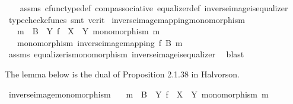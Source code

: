 \begin{isabellebody}
%
\isadelimproof
\ \ %
\endisadelimproof
%
\isatagproof
{}\isamarkupfalse%
\ assms\ cfunc{\isacharunderscore}{\kern0pt}type{\isacharunderscore}{\kern0pt}def\ comp{\isacharunderscore}{\kern0pt}associative\ equalizer{\isacharunderscore}{\kern0pt}def\ inverse{\isacharunderscore}{\kern0pt}image{\isacharunderscore}{\kern0pt}is{\isacharunderscore}{\kern0pt}equalizer{}\isanewline
\ \ \isamarkupfalse%
\ {\isacharparenleft}{\kern0pt}typecheck{\isacharunderscore}{\kern0pt}cfuncs{\isacharcomma}{\kern0pt}\ smt\ {\isacharparenleft}{\kern0pt}verit{\isacharparenright}{\kern0pt}{\isacharparenright}{\kern0pt}%
\endisatagproof
{\isafoldproof}%
%
\isadelimproof
\isanewline
%
\endisadelimproof
\isanewline
{}\isamarkupfalse%
\ inverse{\isacharunderscore}{\kern0pt}image{\isacharunderscore}{\kern0pt}mapping{\isacharunderscore}{\kern0pt}monomorphism{\isacharcolon}{\kern0pt}\isanewline
\ \ \ {\isachardoublequoteopen}m\ {\isacharcolon}{\kern0pt}\ B\ {\isasymrightarrow}\ Y{\isachardoublequoteclose}\ {\isachardoublequoteopen}f\ {\isacharcolon}{\kern0pt}\ X\ {\isasymrightarrow}\ Y{\isachardoublequoteclose}\ {\isachardoublequoteopen}monomorphism\ m{\isachardoublequoteclose}\isanewline
\ \ \ {\isachardoublequoteopen}monomorphism\ {\isacharparenleft}{\kern0pt}inverse{\isacharunderscore}{\kern0pt}image{\isacharunderscore}{\kern0pt}mapping\ f\ B\ m{\isacharparenright}{\kern0pt}{\isachardoublequoteclose}\isanewline
%
\isadelimproof
\ \ %
\endisadelimproof
%
\isatagproof
{}\isamarkupfalse%
\ assms\ equalizer{\isacharunderscore}{\kern0pt}is{\isacharunderscore}{\kern0pt}monomorphism\ inverse{\isacharunderscore}{\kern0pt}image{\isacharunderscore}{\kern0pt}is{\isacharunderscore}{\kern0pt}equalizer{}\ \isamarkupfalse%
\ blast%
\endisatagproof
{\isafoldproof}%
%
\isadelimproof
%
\endisadelimproof
%
\begin{isamarkuptext}%
The lemma below is the dual of Proposition 2.1.38 in Halvorson.%
\end{isamarkuptext}\isamarkuptrue%
\isamarkupfalse%
\ inverse{\isacharunderscore}{\kern0pt}image{\isacharunderscore}{\kern0pt}monomorphism{\isacharcolon}{\kern0pt}\isanewline
\ \ \ {\isachardoublequoteopen}m\ {\isacharcolon}{\kern0pt}\ B\ {\isasymrightarrow}\ Y{\isachardoublequoteclose}\ {\isachardoublequoteopen}f\ {\isacharcolon}{\kern0pt}\ X\ {\isasymrightarrow}\ Y{\isachardoublequoteclose}\ {\isachardoublequoteopen}monomorphism\ m{\isachardoublequoteclose}\isanewline

\end{isabellebody}
